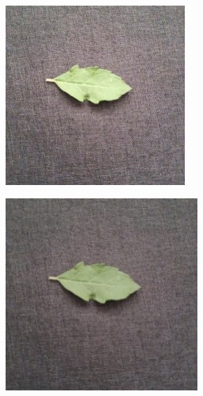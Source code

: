 \documentclass[twocolumn]{article}
\begin{document}
\begin{figure}[H]
    \begin{subfigure}[b]{0.30\columnwidth}
        \includegraphics[width=\textwidth]{tulsi7}
    \end{subfigure}
    \hfill
    \begin{subfigure}[b]{0.30\columnwidth}
        \includegraphics[width=\textwidth]{tulsi8}

\end{subfigure}
\end{figure}
\end{document}
